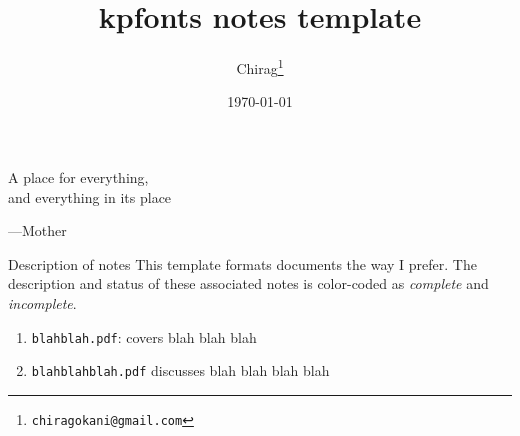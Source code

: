 \documentclass[12pt]{article}
\title{\textsf{kpfonts} notes template}
\author{Chirag\footnote{\texttt{chiragokani@gmail.com}}} %
\date{\today}
\numberwithin{equation}{section}
\begin{document}
\maketitle
\setlength{\epigraphwidth}{0.31\textwidth}
\epigraph{\Fontlukas A place for everything,\\and everything in its place}{\Fontlukas---Mother}

\begin{graytext}{Description of notes}
This template formats documents the way I prefer. The description and status of these associated notes is color-coded as \color{cyan}\textit{complete} \color{black} and  \color{magenta}\textit{incomplete}\color{black}.
\begin{enumerate}[label=(\alph*)]
\item \color{cyan}\texttt{blahblah.pdf}: covers blah blah blah \color{black} 
\item \color{magenta}\texttt{blahblahblah.pdf} discusses blah blah blah blah \color{black} 
\end{enumerate}
\end{graytext}
\tableofcontents
\end{document}
